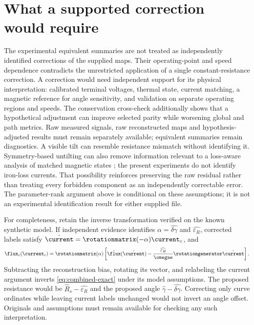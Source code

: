 \section{What a supported correction would require}
The experimental equivalent summaries are not treated as independently
identified corrections of the supplied maps. Their operating-point and speed
dependence contradicts the unrestricted
application of a single constant-resistance correction. A correction would
need independent support for its physical interpretation: calibrated terminal
voltages, thermal state, current matching, a magnetic reference for angle
sensitivity, and validation on separate operating regions and speeds.
The conservation cross-check additionally shows that a hypothetical adjustment
can improve selected parity while worsening global and path metrics.
Raw measured signals, raw reconstructed maps and hypothesis-adjusted results
must remain separately available; equivalent summaries remain diagnostics.
A visible tilt can resemble resistance mismatch without identifying it.
Symmetry-based untilting can also remove information relevant to a loss-aware
analysis of matched magnetic states \cite{companion-coenergy}; the present
experiments do not identify iron-loss currents. That possibility reinforces
preserving the raw residual rather than treating every forbidden component
as an independently correctable error.
The parameter-rank argument above is conditional on these assumptions; it is
not an experimental identification result for either supplied file.

For completeness, retain the inverse transformation verified on the known
synthetic model. If independent evidence identifies
$\alpha=\widehat{\delta\gamma}$ and $\widehat{\varepsilon_R}$, corrected labels
satisfy $\hat\current=\rotationmatrix(-\alpha)\current_c$, and
\begin{equation}
 \flux_c(\current_c)=\rotationmatrix(\alpha)
 \left[\hat\flux(\hat\current)
 -\frac{\widehat{\varepsilon_R}}{\omegae}\rotationgenerator\hat\current\right].
 \label{eq:corrected-map}
\end{equation}
Subtracting the reconstruction bias, rotating its vector, and relabeling the
current argument inverts \cref{eq:combined-exact} under its model assumptions.
The proposed resistance would be $\hat R_s-\widehat{\varepsilon_R}$ and the
proposed angle $\hat\gamma-\widehat{\delta\gamma}$. Correcting only curve
ordinates while leaving current labels unchanged would not invert an angle
offset. Originals and assumptions must remain available for checking any
such interpretation.

